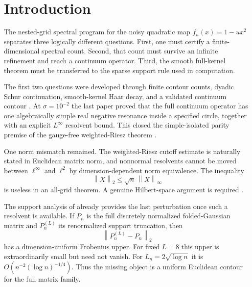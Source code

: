 \documentclass[11pt]{article}
\theoremstyle{definition}
\theoremstyle{remark}
\newcommand{\norm}[1]{\left\lVert #1\right\rVert}
\begin{document}
\section{Introduction}
\label{sec:introduction}

The nested-grid spectral program for the noisy quadratic map
$f_u(x)=1-ux^2$ separates three logically different questions.  First, one
must certify a finite-dimensional spectral count.  Second, that count must
survive an infinite refinement and reach a continuum operator.  Third, the
smooth full-kernel theorem must be transferred to the sparse support rule
used in computation.

The first two questions were developed through finite contour counts,
dyadic Schur continuation, smooth-kernel Haar decay, and a validated
continuum contour
\citep{WangNested2026,WangHaar2026,WangContinuumContour2026}.  At
$\sigma=10^{-2}$ the last paper proved that the full continuum operator has
one algebraically simple real negative resonance inside a specified circle,
together with an explicit $L^\infty$ resolvent bound.  This closed the
simple-isolated parity premise of the gauge-free weighted-Riesz theorem
\citep{WangRiesz2026}.

One norm mismatch remained.  The weighted-Riesz cutoff estimate is naturally
stated in Euclidean matrix norm, and nonnormal resolvents cannot be moved
between $\ell^\infty$ and $\ell^2$ by dimension-dependent norm equivalence.
The inequality
\[
 \norm{X}_2\le\sqrt n\,\norm{X}_\infty
\]
is useless in an all-grid theorem.  A genuine Hilbert-space argument is
required \citep{TrefethenEmbree2005}.

The support analysis of \citet{WangCutoff2026} already provides the last
perturbation once such a resolvent is available.  If $P_n$ is the full
discretely normalized folded-Gaussian matrix and $P_n^{(L)}$ its
renormalized support truncation, then
\[
 \norm{P_n^{(L)}-P_n}_2
\]
has a dimension-uniform Frobenius upper.  For fixed $L=8$ this upper is
extraordinarily small but need not vanish.  For
$L_n=2\sqrt{\log n}$ it is
$O(n^{-2}(\log n)^{-1/4})$.  Thus the missing object is a uniform
Euclidean contour for the full matrix family.
\end{document}
